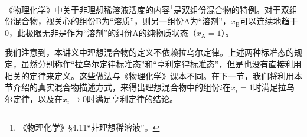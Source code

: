 \documentclass[main.tex]{subfiles}
\begin{document}
《物理化学》中关于非理想稀溶液活度的内容\footnote{《物理化学》\S4.11“非理想稀溶液”。}是双组份混合物的特例。对于双组份混合物，视关心的组份B为“溶质”，则另一组份A为“溶剂”，$x_\text{B}$可以连续地趋于0，此极限无非是作为“溶剂”的组份A的纯物质状态（$x_\text{A}=1$）。

我们注意到，本讲义中理想混合物的定义不依赖拉乌尔定律。上述两种标准态的规定，虽然分别称作“拉乌尔定律标准态”和“亨利定律标准态”，但是也没有直接利用相关的定律来定义。这些做法与《物理化学》课本不同。在下一节，我们将利用本节介绍的真实混合物描述方式，来得出理想混合物中的组份$i$在$x_i=1$时满足拉乌尔定律，以及在$x_i\rightarrow 0$时满足亨利定律的结论。
\end{document}
